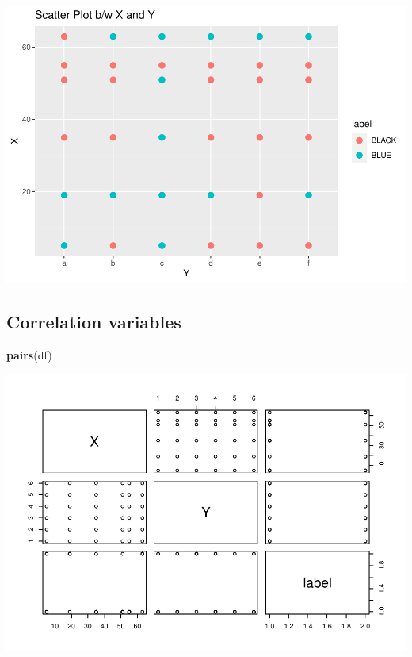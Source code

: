 \documentclass[
]{article}
\newenvironment{Shaded}{\begin{snugshade}}{\end{snugshade}}
\newcommand{\KeywordTok}[1]{\textcolor[rgb]{0.13,0.29,0.53}{\textbf{#1}}}
\newcommand{\NormalTok}[1]{#1}
\begin{document}
\includegraphics{622_HW1_files/figure-latex/unnamed-chunk-3-4.pdf}

\hypertarget{correlation-variables}{%
\subsection{\texorpdfstring{\textbf{Correlation
variables}}{Correlation variables}}\label{correlation-variables}}

\begin{Shaded}
\begin{Highlighting}[]
\KeywordTok{pairs}\NormalTok{(df)}
\end{Highlighting}
\end{Shaded}

\includegraphics{622_HW1_files/figure-latex/unnamed-chunk-4-1.pdf}
\end{document}
